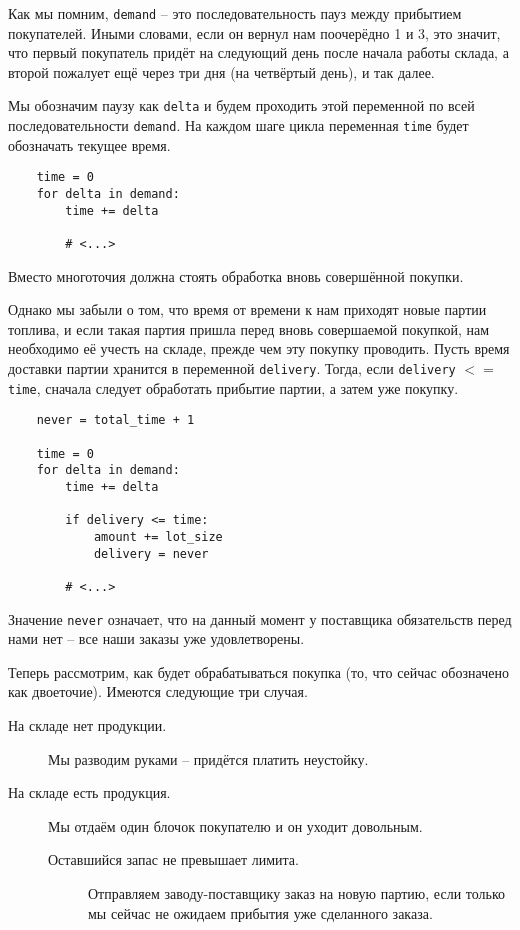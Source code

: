 \documentclass[12pt,final]{article}
\begin{document}
Как мы помним, \texttt{demand} -- это последовательность пауз между прибытием покупателей. Иными словами, если он вернул нам поочерёдно 1 и 3, это значит, что первый покупатель придёт на следующий день после начала работы склада, а второй пожалует ещё через три дня (на четвёртый день), и так далее.

Мы обозначим паузу как \texttt{delta} и будем проходить этой переменной по всей последовательности \texttt{demand}. На каждом шаге цикла переменная \texttt{time} будет обозначать текущее время.

\begin{verbatim}
    time = 0
    for delta in demand:
        time += delta
        
        # <...>
\end{verbatim}

Вместо многоточия должна стоять обработка вновь совершённой покупки.

Однако мы забыли о том, что время от времени к нам приходят новые партии топлива, и если такая партия пришла перед вновь совершаемой покупкой, нам необходимо её учесть на складе, прежде чем эту покупку проводить. Пусть время доставки партии хранится в переменной \texttt{delivery}. Тогда, если \texttt{delivery} $<=$ \texttt{time}, сначала следует обработать прибытие партии, а затем уже покупку.

\begin{verbatim}
    never = total_time + 1
    
    time = 0
    for delta in demand:
        time += delta
        
        if delivery <= time:
            amount += lot_size
            delivery = never
        
        # <...>
\end{verbatim}

Значение \texttt{never} означает, что на данный момент у поставщика обязательств перед нами нет -- все наши заказы уже удовлетворены.

Теперь рассмотрим, как будет обрабатываться покупка (то, что сейчас обозначено  как двоеточие). Имеются следующие три случая.

\begin{description}
    \item[На складе нет продукции.] Мы разводим руками -- придётся платить неустойку.
    \item[На складе есть продукция.] Мы отдаём один блочок покупателю и он уходит довольным.
    \begin{description}
        \item[Оставшийся запас не превышает лимита.] Отправляем заводу-поставщику заказ на новую партию, если только мы сейчас не ожидаем прибытия уже сделанного заказа.
    \end{description}
\end{description}
\end{document}
